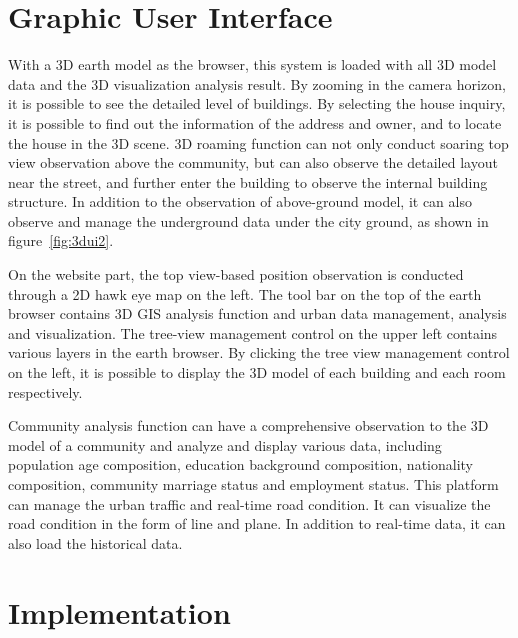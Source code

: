 \documentclass{vgtc}
\begin{document}
\section{Graphic User Interface}

With a 3D earth model as the browser, this system is loaded with all 3D model data and the 3D visualization analysis result. By zooming in the camera horizon, it is possible to see the detailed level of buildings. By selecting the house inquiry, it is possible to find out the information of the address and owner, and to locate the house in the 3D scene. 3D roaming function can not only conduct soaring top view observation above the community, but can also observe the detailed layout near the street, and further enter the building to observe the internal building structure. In addition to the observation of above-ground model, it can also observe and manage the underground data under the city ground, as shown in figure~\ref{fig:3dui2}.

On the website part, the top view-based position observation is conducted through a 2D hawk eye map on the left. The tool bar on the top of the earth browser contains 3D GIS analysis function and urban data management, analysis and visualization. The tree-view management control on the upper left contains various layers in the earth browser. By clicking the tree view management control on the left, it is possible to display the 3D model of each building and each room respectively. 

Community analysis function can have a comprehensive observation to the 3D model of a community and analyze and display various data, including population age composition, education background composition, nationality composition, community marriage status and employment status. This platform can manage the urban traffic and real-time road condition. It can visualize the road condition in the form of line and plane. In addition to real-time data, it can also load the historical data. 

\section{Implementation}
\end{document}
